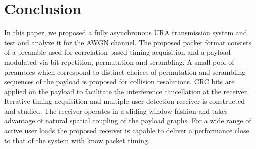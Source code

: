 \documentclass[journal,onecolumn,12pt]{IEEEtran}
\begin{document}
\section{Conclusion}
\label{sec:Conclusion}
In this paper, we proposed a fully asynchronous URA transmission system and test and analyze it for the AWGN channel. The proposed packet format consists of a preamble used for correlation-based timing acquisition and a payload modulated via bit repetition, permutation and scrambling. A small pool of preambles which correspond to distinct choices of permutation and scrambling sequences of the payload is proposed for collision resolutions. CRC bits are applied on the payload to facilitate the interference cancellation at the receiver.  Iterative timing acquisition and multiple user detection receiver is constructed and studied. The receiver operates in a sliding window fashion and takes advantage of natural spatial coupling of the payload graphs. For a wide range of active user loads the proposed receiver is capable to deliver a performance close to that of the system with know packet timing.

\end{document}
